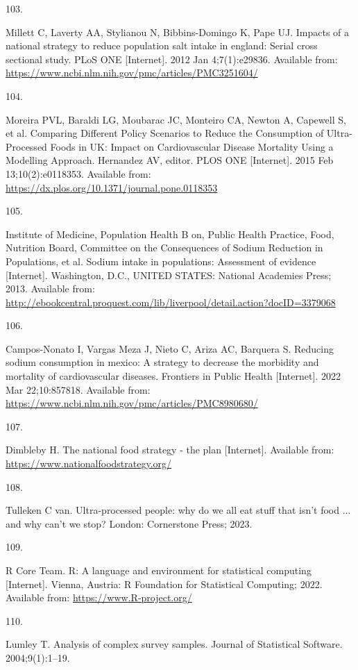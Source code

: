 \documentclass[
]{article}
\newlength{\cslhangindent}
\newlength{\csllabelwidth}
\newlength{\cslentryspacingunit} %
\newenvironment{CSLReferences}[2] %
 {%
  \setlength{\parindent}{0pt}
  \ifodd #1
  \let\oldpar\par
  \def\par{\hangindent=\cslhangindent\oldpar}
  \fi
  \setlength{\parskip}{#2\cslentryspacingunit}
 }%
 {}
\newcommand{\CSLLeftMargin}[1]{\parbox[t]{\csllabelwidth}{#1}}
\newcommand{\CSLRightInline}[1]{\parbox[t]{\linewidth - \csllabelwidth}{#1}\break}
\begin{document}
\begin{CSLReferences}{0}{0}
\leavevmode{}%
\CSLLeftMargin{103. }%
\CSLRightInline{Millett C, Laverty AA, Stylianou N, Bibbins-Domingo K,
Pape UJ. Impacts of a national strategy to reduce population salt intake
in england: Serial cross sectional study. PLoS ONE {[}Internet{]}. 2012
Jan 4;7(1):e29836. Available from:
\url{https://www.ncbi.nlm.nih.gov/pmc/articles/PMC3251604/}}

\leavevmode{}%
\CSLLeftMargin{104. }%
\CSLRightInline{Moreira PVL, Baraldi LG, Moubarac JC, Monteiro CA,
Newton A, Capewell S, et al. Comparing Different Policy Scenarios to
Reduce the Consumption of Ultra-Processed Foods in UK: Impact on
Cardiovascular Disease Mortality Using a Modelling Approach. Hernandez
AV, editor. PLOS ONE {[}Internet{]}. 2015 Feb 13;10(2):e0118353.
Available from: \url{https://dx.plos.org/10.1371/journal.pone.0118353}}

\leavevmode{}%
\CSLLeftMargin{105. }%
\CSLRightInline{Institute of Medicine, Population Health B on, Public
Health Practice, Food, Nutrition Board, Committee on the Consequences of
Sodium Reduction in Populations, et al. Sodium intake in populations:
Assessment of evidence {[}Internet{]}. Washington, D.C., UNITED STATES:
National Academies Press; 2013. Available from:
\url{http://ebookcentral.proquest.com/lib/liverpool/detail.action?docID=3379068}}

\leavevmode{}%
\CSLLeftMargin{106. }%
\CSLRightInline{Campos-Nonato I, Vargas Meza J, Nieto C, Ariza AC,
Barquera S. Reducing sodium consumption in mexico: A strategy to
decrease the morbidity and mortality of cardiovascular diseases.
Frontiers in Public Health {[}Internet{]}. 2022 Mar 22;10:857818.
Available from:
\url{https://www.ncbi.nlm.nih.gov/pmc/articles/PMC8980680/}}

\leavevmode{}%
\CSLLeftMargin{107. }%
\CSLRightInline{Dimbleby H. The national food strategy - the plan
{[}Internet{]}. Available from:
\url{https://www.nationalfoodstrategy.org/}}

\leavevmode{}%
\CSLLeftMargin{108. }%
\CSLRightInline{Tulleken C van. Ultra-processed people: why do we all
eat stuff that isn't food ... and why can't we stop? London: Cornerstone
Press; 2023. }

\leavevmode{}%
\CSLLeftMargin{109. }%
\CSLRightInline{R Core Team. {R}: A language and environment for
statistical computing {[}Internet{]}. Vienna, Austria: R Foundation for
Statistical Computing; 2022. Available from:
\url{https://www.R-project.org/}}

\leavevmode{}%
\CSLLeftMargin{110. }%
\CSLRightInline{Lumley T. Analysis of complex survey samples. Journal of
Statistical Software. 2004;9(1):1--19. }

\end{CSLReferences}
\end{document}
